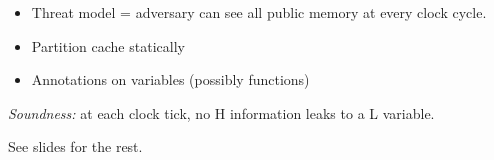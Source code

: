 \documentclass{article}
\begin{document}
\begin{itemize}
\item Threat model = adversary can see all public memory at every clock cycle.

\item Partition cache statically

\item Annotations on variables (possibly functions)
  
\end{itemize}

\emph{Soundness:} at each clock tick, no H information leaks to a L variable.
  
See slides for the rest. 
\end{document}
